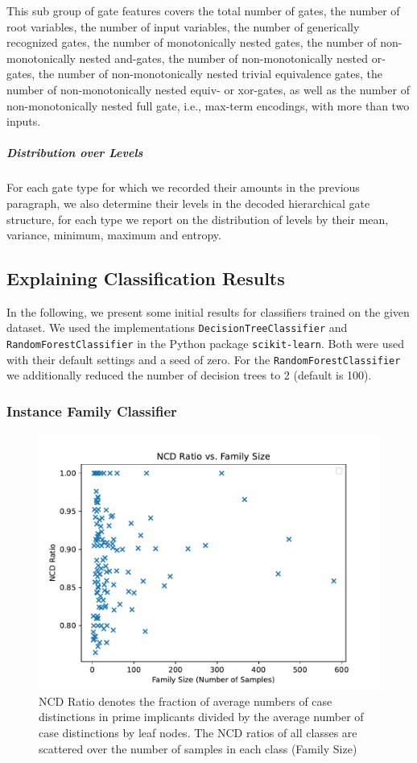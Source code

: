 \documentclass[a4paper, USenglish, cleveref, autoref, thm-restate]{lipics-v2021}
\theoremstyle{definition}
\begin{document}
This sub group of gate features covers the total number of gates, the number of root variables, the number of input variables, the number of generically recognized gates, the number of monotonically nested gates, the number of non-monotonically nested and-gates, the number of non-monotonically nested or-gates, the number of non-monotonically nested trivial equivalence gates, the number of non-monotonically nested equiv- or xor-gates, as well as the number of non-monotonically nested full gate, i.e., max-term encodings, with more than two inputs. 

\subparagraph{Distribution over Levels}

For each gate type for which we recorded their amounts in the previous paragraph, we also determine their levels in the decoded hierarchical gate structure, for each type we report on the distribution of levels by their \textsf{mean}, \textsf{variance}, \textsf{minimum}, \textsf{maximum} and \textsf{entropy}. 


\subsection{Explaining Classification Results}

In the following, we present some initial results for classifiers trained on the given dataset. 
We used the implementations \verb!DecisionTreeClassifier! and \verb!RandomForestClassifier! in the Python package \verb!scikit-learn!. 
Both were used with their default settings and a seed of zero. 
For the \verb!RandomForestClassifier! we additionally reduced the number of decision trees to 2 (default is 100). 

\subsubsection{Instance Family Classifier}

\begin{figure}
\centering
\includegraphics[width=.9\linewidth]{fig2/ncd-ratio-vs-family-size.pdf}
\caption{NCD Ratio denotes the fraction of average numbers of case distinctions in prime implicants divided by the average number of case distinctions by leaf nodes. The NCD ratios of all classes are scattered over the number of samples in each class (Family Size)}
\label{fig:ncdr-vs-size}
\end{figure}
\end{document}
